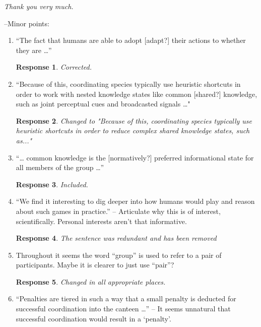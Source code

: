 \documentclass[a4paper]{article}
\newtheorem{response}{Response}
\begin{document}
\medskip
{\noindent \itshape
Thank you very much. 
}





\medskip
--Minor points:
\begin{enumerate}
   \item[1.]    “The fact that humans are able to adopt [adapt?] their actions to whether they are …” \begin{response} Corrected. \end{response}
   \item[2.]    “Because of this, coordinating species typically use heuristic shortcuts in order to work with nested knowledge states like common [shared?] knowledge, such as joint perceptual cues and broadcasted signals …" \begin{response}Changed to "Because of this, coordinating species typically use heuristic shortcuts in order to reduce complex shared knowledge states, such as..."\end{response} 
  \item[4.]    “… common knowledge is the [normatively?] preferred informational state for all members of the group …” \begin{response} Included. \end{response}
  \item[5.]    “We find it interesting to dig deeper into how humans would play and reason about such games in practice.” – Articulate why this is of interest, scientifically. Personal interests aren’t that informative. \begin{response}The sentence was redundant and has been removed \end{response}
  \item[6.]    Throughout it seems the word “group” is used to refer to a pair of participants. Maybe it is clearer to just use “pair”?  \begin{response} Changed in all appropriate places. \end{response}
  \item[7.]    “Penalties are tiered in such a way that a small penalty is deducted for successful coordination into the canteen …” – It seems unnatural that successful coordination would result in a ‘penalty’.  
  

\end{enumerate}
\end{document}
